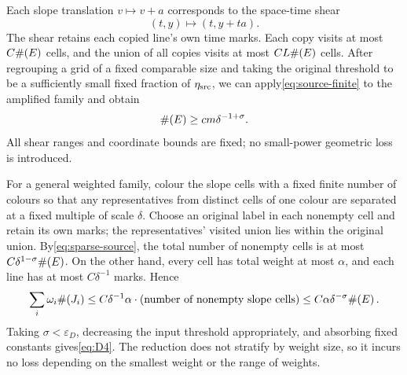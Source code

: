 Each slope translation $v\mapsto v+a$ corresponds to the space-time shear
\[
 (t,y)\mapsto(t,y+ta).
\]
The shear retains each copied line's own time marks.
Each copy visits at most $C\#\!\left(E\right)$ cells, and the union of all copies visits at most $CL\#\!\left(E\right)$ cells.
After regrouping a grid of a fixed comparable size and taking the original threshold to be a sufficiently small fixed fraction of $\eta_{\rm src}$,
we can apply\eqref{eq:source-finite} to the amplified family and obtain
\begin{equation}\label{eq:sparse-source}
 \#\!\left(E\right)\ge c m\delta^{-1+\sigma}.
\end{equation}
All shear ranges and coordinate bounds are fixed; no small-power geometric loss is introduced.

For a general weighted family, colour the slope cells with a fixed finite number of colours so that
any representatives from distinct cells of one colour are separated at a fixed multiple of scale $\delta$.
Choose an original label in each nonempty cell and retain its own marks; the representatives' visited union lies within the original union.
By\eqref{eq:sparse-source}, the total number of nonempty cells is at most $C\delta^{1-\sigma}\#\!\left(E\right)$.
On the other hand, every cell has total weight at most $\alpha$, and each line has at most $C\delta^{-1}$ marks. Hence
\[
 \sum_i\omega_i\#\!\left(J_i\right)
 \le C\delta^{-1}\alpha\cdot
       (\text{number of nonempty slope cells})
 \le C\alpha\delta^{-\sigma}\#\!\left(E\right).
\]
Taking $\sigma<\varepsilon_D$, decreasing the input threshold appropriately, and absorbing fixed constants gives\eqref{eq:D4}.
The reduction does not stratify by weight size, so it incurs no loss depending on the smallest weight or the range of weights.

